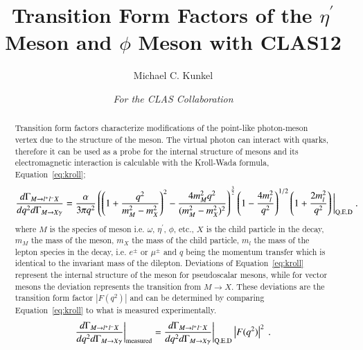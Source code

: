 \documentclass{aip-cp}
\begin{document}
\title{Transition Form Factors of the $\eta^{\prime}$ Meson and $\phi$ Meson with CLAS12}
\author[aff1]{Michael C. Kunkel}
\author{\textit{For the CLAS Collaboration}}
\maketitle

\begin{abstract}
Transition form factors characterize modifications of the point-like photon-meson vertex due to the structure of the meson. The virtual photon can interact with quarks, therefore it can be used as a probe for the internal structure of mesons and its electromagnetic interaction is calculable with the Kroll-Wada formula, Equation~\ref{eq:kroll};
\begin{equation}
\frac{d\Gamma_{M{\rightarrow l^{+}l^{-}X}}}{dq^{2} d\Gamma_{M{\rightarrow X\gamma}}} = \frac{\alpha}{3\pi q^{2}}\left(\left(1+\frac{q^{2}}{m^{2}_{M}-m^{2}_{X}}\right)^2 - \frac{4m^{2}_{M}q^2}{(m^{2}_{M}-m^{2}_{X})^2}\right)^\frac{3}{2}\left(1-\frac{4m_{l}^{2}}{q^{2}}\right)^{1/2}\left(1+\frac{2m_{l}^{2}}{q^{2}}\right) \bigg|_{\mathrm{Q.E.D}}  \label{eq:kroll} \ . \\
\end{equation}
 where $M$ is the species of meson i.e. $\omega$, $\eta^{\prime}$, $\phi$, etc., $X$ is the child particle in the decay, $m_M$ the mass of the meson, $m_X$ the mass of the child particle, $m_l$ the mass of the lepton species in the decay, i.e. $e^{\pm}$ or $\mu^{\pm}$ and $q$ being the momentum transfer which is identical to the invariant mass of the dilepton. Deviations of Equation~\ref{eq:kroll} represent the internal structure of the meson for pseudoscalar mesons, while for vector mesons the deviation represents the transition from $M \to X$. These deviations are the transition form factor $\left| F(q^2)\right|$ and can be determined by comparing Equation~\ref{eq:kroll} to what is measured experimentally.
 \begin{equation}
 \frac{d\Gamma_{M{\rightarrow l^{+}l^{-}X}}}{dq^{2} d\Gamma_{M{\rightarrow X\gamma}}}\bigg|_{\mathrm{measured}} =   \frac{d\Gamma_{M{\rightarrow l^{+}l^{-}X}}}{dq^{2} d\Gamma_{M{\rightarrow X\gamma}}} \bigg|_{\mathrm{Q.E.D}} \left| F(q^2)\right|^2 \label{eq:kroll_ff} \ . \\
 \end{equation}

\end{abstract}
\end{document}
